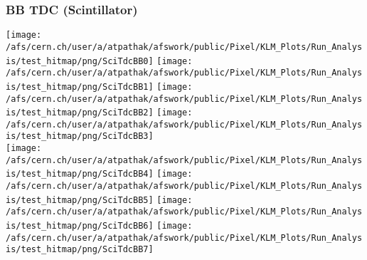 \documentclass{beamer}
\begin{document}
\begin{frame}
\frametitle{BB TDC (Scintillator)}
\vspace*{.05cm}
\begin{center}
\begin{normalsize}

\vspace*{-.2cm}
\begin{center}

  \texttt{[image: /afs/cern.ch/user/a/atpathak/afswork/public/Pixel/KLM\_Plots/Run\_Analysis/test\_hitmap/png/SciTdcBB0]}
  \texttt{[image: /afs/cern.ch/user/a/atpathak/afswork/public/Pixel/KLM\_Plots/Run\_Analysis/test\_hitmap/png/SciTdcBB1]}
  \texttt{[image: /afs/cern.ch/user/a/atpathak/afswork/public/Pixel/KLM\_Plots/Run\_Analysis/test\_hitmap/png/SciTdcBB2]}
  \texttt{[image: /afs/cern.ch/user/a/atpathak/afswork/public/Pixel/KLM\_Plots/Run\_Analysis/test\_hitmap/png/SciTdcBB3]} \\
  \texttt{[image: /afs/cern.ch/user/a/atpathak/afswork/public/Pixel/KLM\_Plots/Run\_Analysis/test\_hitmap/png/SciTdcBB4]}
  \texttt{[image: /afs/cern.ch/user/a/atpathak/afswork/public/Pixel/KLM\_Plots/Run\_Analysis/test\_hitmap/png/SciTdcBB5]}
  \texttt{[image: /afs/cern.ch/user/a/atpathak/afswork/public/Pixel/KLM\_Plots/Run\_Analysis/test\_hitmap/png/SciTdcBB6]}
  \texttt{[image: /afs/cern.ch/user/a/atpathak/afswork/public/Pixel/KLM\_Plots/Run\_Analysis/test\_hitmap/png/SciTdcBB7]}


\end{center}
\end{normalsize}
\end{center}
\end{frame}
\end{document}
